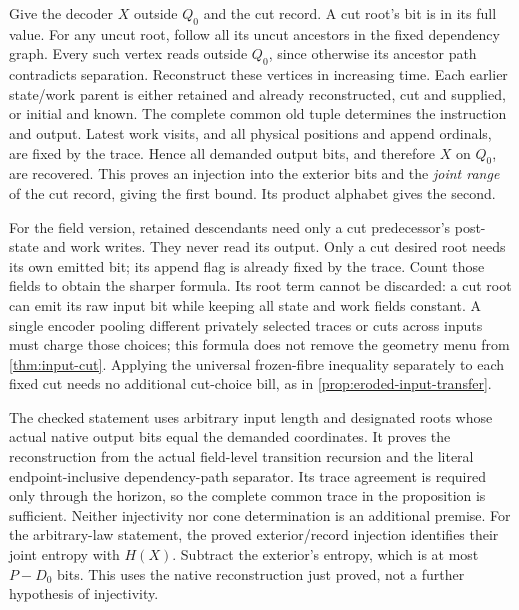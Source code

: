 \begin{outline}
Give the decoder $X$ outside $Q_0$ and the cut record. A cut root's bit
is in its full value. For any uncut root, follow all its uncut ancestors
in the fixed dependency graph. Every such vertex reads outside $Q_0$,
since otherwise its ancestor path contradicts separation. Reconstruct
these vertices in increasing time. Each earlier state/work parent is
either retained and already reconstructed, cut and supplied, or initial
and known. The complete common old tuple determines the instruction and
output. Latest work visits, and all physical positions and append ordinals,
are fixed by the trace. Hence all demanded output bits, and therefore
$X$ on $Q_0$, are recovered. This proves an injection into the exterior
bits and the \emph{joint range} of the cut record, giving the first bound.
Its product alphabet gives the second.

For the field version, retained descendants need only a cut predecessor's
post-state and work writes. They never read its output. Only a cut desired
root needs its own emitted bit; its append flag is already fixed by the
trace. Count those fields to obtain the sharper formula. Its root term
cannot be discarded: a cut root can emit its raw input bit while keeping
all state and work fields constant. A single encoder pooling different
privately selected traces or cuts across inputs must charge those choices;
this formula does not remove the geometry menu from \cref{thm:input-cut}.
Applying the universal frozen-fibre inequality separately to each fixed
cut needs no additional cut-choice bill, as in
\cref{prop:eroded-input-transfer}.

The checked statement uses arbitrary input length and designated roots
whose actual native output bits equal the demanded coordinates. It proves
the reconstruction from the actual field-level transition recursion and
the literal endpoint-inclusive dependency-path separator. Its trace
agreement is required only through the horizon, so the complete common
trace in the proposition is sufficient. Neither injectivity nor cone
determination is an additional premise.
For the arbitrary-law statement, the proved exterior/record injection
identifies their joint entropy with $H(X)$. Subtract the exterior's entropy,
which is at most $P-D_0$ bits. This uses the native reconstruction just
proved, not a further hypothesis of injectivity.
\end{outline}
